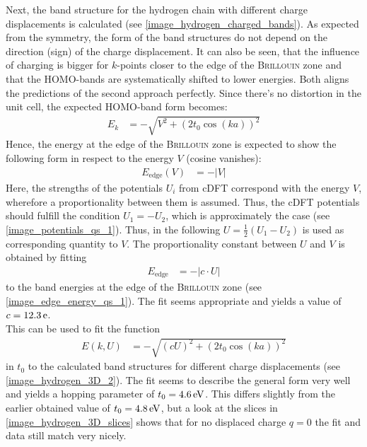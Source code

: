 Next, the band structure for the hydrogen chain with different charge displacements is calculated (see \cref{image_hydrogen_charged_bands}). As expected from the symmetry, the form of the band structures do not depend on the direction (sign) of the charge displacement. It can also be seen, that the influence of charging is bigger for $k$-points closer to the edge of the \textsc{Brillouin} zone and that the HOMO-bands are systematically shifted to lower energies. Both aligns the predictions of the second approach perfectly.
Since there's no distortion in the unit cell, the expected HOMO-band form becomes:
\begin{align}
E_k &= -\sqrt{V^2 + \left(2t_0\cos(ka)\right)^2}
\end{align}
Hence, the energy at the edge of the \textsc{Brillouin} zone is expected to show the following form in respect to the energy $V$ (cosine vanishes):
\begin{align}
E_\text{edge}(V) &= -\left|V\right|
\end{align}
Here, the strengths of the potentials $U_i$ from cDFT correspond with the energy $V$, wherefore a proportionality between them is assumed. Thus, the cDFT potentials should fulfill the condition $U_1 = - U_2$, which is approximately the case (see \cref{image_potentials_qs_1}). Thus, in the following $U = \frac{1}{2}(U_1 - U_2)$ is used as corresponding quantity to $V$.
The proportionality constant between $U$ and $V$ is obtained by fitting
\begin{align}
	E_\text{edge} &= -\left|c \cdot U\right|
\end{align}
to the band energies at the edge of the \textsc{Brillouin} zone (see \cref{image_edge_energy_qs_1}). The fit seems appropriate and yields a value of $c = \unit[12.3]{e}$.\\
This can be used to fit the function
\begin{align}
	E\left(k, U\right) &= - \sqrt{\left(cU\right)^2 + \left(2t_0\cos(ka)\right)^2}
\end{align}
in $t_0$ to the calculated band structures for different charge displacements (see \cref{image_hydrogen_3D_2}). The fit seems to describe the general form very well and yields a hopping parameter of $t_0 = \unit[4.6]{eV}$. This differs slightly from the earlier obtained value of $t_0 = \unit[4.8]{eV}$, but a look at the slices in \cref{image_hydrogen_3D_slices} shows that for no displaced charge $q = 0$ the fit and data still match very nicely.\\
